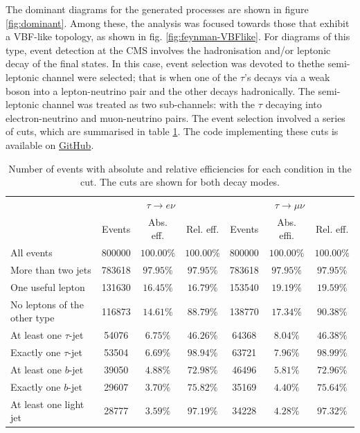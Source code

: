 The dominant diagrams for the generated processes are shown in figure \ref{fig:dominant}. Among these, the analysis was focused towards those that exhibit a VBF-like topology, as shown in fig. \ref{fig:feynman-VBFlike}. For diagrams of this type, event detection at the CMS involves the hadronisation and/or leptonic decay of the final states. In this case, event selection was devoted to thethe semi-leptonic channel were selected; that is when one of the $\tau$'s decays via a weak boson into a lepton-neutrino pair and the other decays hadronically. The semi-leptonic channel was treated as two sub-channels: with the $\tau$ decaying into electron-neutrino and muon-neutrino pairs. The event selection involved a series of cuts, which are summarised in table \ref{tab:cuts}. The code implementing these cuts is available on \href{https://github.com/DanielDoradoPhys/LeptoquarksPheno}{GitHub}.

\begin{table}[ht]
    \centering
    \begin{tabular}{l|c c c |c c c }
        \toprule
        & \multicolumn{3}{c}{$\tau \to e\nu$} & \multicolumn{3}{c}{$\tau \to \mu\nu$}  \\ 
        & Events & Abs. eff. & Rel. eff. & Events & Abs. effi. & Rel. eff. \\\midrule
        All events & 800000 & $100.00\%$ &  $100.00\%$ & 800000 & $100.00\%$ &  $100.00\%$ \\
        More than two jets & 783618 & $97.95\%$ & $97.95\%$ & 783618 & $97.95\%$ & $97.95\%$ \\
        One useful lepton & 131630 & $16.45\%$ & $16.79\%$ & 153540 & $19.19\%$ & $19.59\%$ \\
        No leptons of the other type & 116873 & $14.61\%$ & $88.79\%$ & 138770 & $17.34\%$ & $90.38\%$ \\
        At least one $\tau$-jet & 54076 & $6.75\%$ & $46.26\%$ & 64368 & $8.04\%$ & $46.38\%$ \\
        Exactly one $\tau$-jet & 53504 & $6.69\%$ & $98.94\%$ & 63721 & $7.96\%$ & $98.99\%$ \\
        At least one $b$-jet & 39050 & $4.88\%$ & $72.98\%$ & 46496 & $5.81\%$ & $72.96\%$ \\
        Exactly one $b$-jet & 29607 & $3.70\%$ & $75.82\%$ & 35169 & $4.40\%$ & $75.64\%$ \\
        At least one light jet & 28777 & $3.59\%$ & $97.19\%$ & 34228 & $4.28\%$ & $97.32\%$ \\
        \bottomrule
    \end{tabular}
    \caption{Number of events with absolute and relative efficiencies for each condition in the cut. The cuts are shown for both decay modes.}
    \label{tab:cuts}
\end{table}

